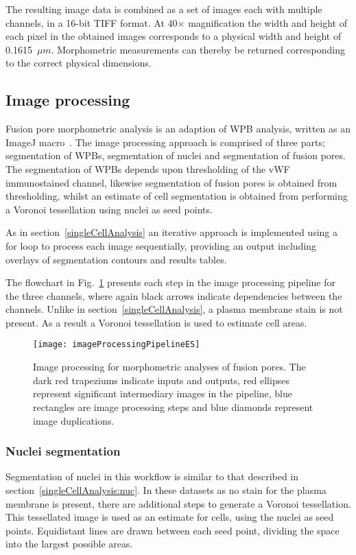 The resulting image data is combined as a set of images each with multiple channels, in a 16-bit TIFF format. At 40$\times$ magnification the width and height of each pixel in the obtained images corresponds to a physical width and height of 0.1615~$\mu m$. Morphometric measurements can thereby be returned corresponding to the correct physical dimensions. 

\subsection{Image processing}
Fusion pore morphometric analysis is an adaption of WPB analysis, written as an ImageJ macro~\cite{Schneider2012}. The image processing approach is comprised of three parts; segmentation of WPBs, segmentation of nuclei and segmentation of fusion pores. The segmentation of WPBs depends upon thresholding of the vWF immunostained channel, likewise segmentation of fusion pores is obtained from thresholding, whilst an estimate of cell segmentation is obtained from performing a Voronoi tessellation using nuclei as seed points.

As in section~\ref{singleCellAnalysis} an iterative approach is implemented using a for loop to process each image sequentially, providing an output including overlays of segmentation contours and results tables.

The flowchart in Fig.~\ref{imageProcessingPipeline:exitSites} presents each step in the image processing pipeline for the three channels, where again black arrows indicate dependencies between the channels. Unlike in section~\ref{singleCellAnalysis}, a plasma membrane stain is not present. As a result a Voronoi tessellation is used to estimate cell areas.

\begin{figure}[htbp]
	\centering
	\texttt{[image: imageProcessingPipelineES]}
	\caption[Image processing pipeline]{Image processing for morphometric analyses of fusion pores. The dark red trapeziums indicate inputs and outputs, red ellipses represent significant intermediary images in the pipeline, blue rectangles are image processing steps and blue diamonds represent image duplications.}
	\label{imageProcessingPipeline:exitSites}
\end{figure}

\subsubsection{Nuclei segmentation}
\label{exitSites:nuc}
Segmentation of nuclei in this workflow is similar to that described in section~\ref{singleCellAnalysis:nuc}. In these datasets as no stain for the plasma membrane is present, there are additional steps to generate a Voronoi tessellation. This tessellated image is used as an estimate for cells, using the nuclei as seed points. Equidistant lines are drawn between each seed point, dividing the space into the largest possible areas. 

